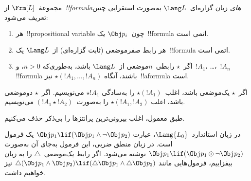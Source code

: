 \documentclass[../../../include/open-logic-section]{subfiles}
\begin{document}


\begin{defn}[فرمول]
مجموعهٔ~$\Frm[L]$ از~\emph{!!{formula}های} زبان گزاره‌ای~$\Lang L$
به‌صورت استقرایی چنین تعریف می‌شود:
\begin{enumerate}
\item هر~!!{propositional variable} چون~$\Obj p_i$ یک~!!{formula} اتمی
  است.
\item هر رابط صفرموضعی (ثابت گزاره‌ای) از~$\Lang L$ یک~!!{formula}
اتمی است.
\item اگر~$\star$ رابطی~$n$موضعی از~$\Lang L$ باشد، به‌طوری‌که
$n>0$، و~$!A_1$، \dots،~$!A_n$ !!{formula} باشند، آنگاه
$\star(!A_1, \dots, !A_n)$ نیز~!!a{formula} است.
\end{enumerate}
اگر~$\star$ یک‌موضعی باشد، اغلب~$\star(!A_1)$ را به‌سادگی
$\star !A_1$ می‌نویسیم. اگر~$\star$ دوموضعی باشد، اغلب
$\star(!A_1,!A_2)$ را به‌صورت~$(!A_1 \star !A_2)$ می‌نویسیم.
\end{defn}

طبق معمول، اغلب بیرونی‌ترین پرانتزها را بی‌ذکر حذف می‌کنیم.

\begin{ex}
  در زبان استاندارد~$\Lang{L_0}$، عبارت
  $\Obj p_1 \lif (\Obj p_1 \land \lnot \Obj p_2)$ یک فرمول است. در
  زبان منطق ضربی، این فرمول به‌جای آن به‌صورت
  $\Obj p_1 \lif (\Obj p_1 \odot \lnot \Obj p_2)$ نوشته می‌شود. اگر
  رابط یک‌موضعی~$\triangle$ را به زبان بیفزاییم، فرمول‌هایی مانند
  $\triangle (\Obj p_1 \land \Obj p_2) \lif
  (\triangle \Obj p_1 \land \triangle \Obj p_2)$ نیز خواهیم داشت.
\end{ex}
\end{document}
